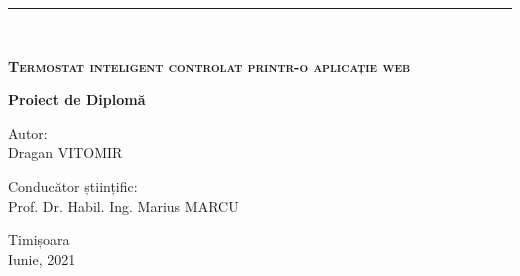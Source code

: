 \begin{titlepage}
\begin{center}
\begin{minipage}{0.3\textwidth}
            \begin{flushright}
            \end{flushright}
        \end{minipage}
    \end{center}
    
    \noindent\rule{\textwidth}{1pt}\\[4cm]
    
    \begin{center}
        \begin{doublespacing}
		{\huge \bfseries \textsc{Termostat inteligent controlat printr-o aplicație web}}\\[2.5cm]
	 \end{doublespacing}
        {\large \bfseries Proiect de Diplomă}\\[2cm]
        \begin{flushright}
            \large
            Autor:\\
	      Dragan VITOMIR\\[1cm]
        \end{flushright}
        \begin{flushleft}
            \large
            Conducător științific:\\
            Prof. Dr. Habil. Ing. Marius MARCU\\[2cm]
        \end{flushleft}
        {\small Timișoara \\Iunie, 2021}
    \end{center}
\end{titlepage}
\restoregeometry
\shipout\null